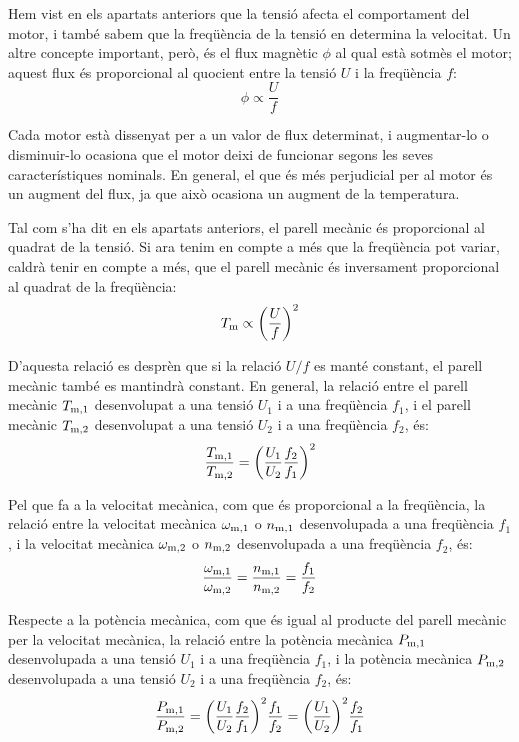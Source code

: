 Hem vist en els apartats anteriors que la tensió afecta el comportament del motor, i també sabem que la freqüència de la tensió en determina la velocitat. Un altre concepte important, però, és el flux magnètic $\phi$ al qual està sotmès el motor; aquest flux és proporcional al quocient entre la tensió $U$ i la freqüència $f$:
\begin{equation}
	\phi \propto \frac{U}{f}
\end{equation}

Cada motor està dissenyat per a un valor de flux determinat, i augmentar-lo  o disminuir-lo ocasiona que el motor deixi de funcionar segons les seves característiques nominals. En general, el que és més perjudicial per al motor és un augment del flux, ja que això ocasiona un  augment de la temperatura.

Tal com s'ha dit en els apartats anteriors, el parell mecànic és proporcional al quadrat de la tensió. Si ara tenim en compte a més que la freqüència pot variar, caldrà tenir en compte a més, que el parell mecànic és inversament proporcional al quadrat de la freqüència:
\begin{equation}
	T_\mathrm{m} \propto {\left(\frac{U}{f}\right)}^2
\end{equation}

D'aquesta relació es desprèn que si la relació $U/f$ es manté constant, el parell mecànic també es mantindrà constant. En general, la relació entre el parell mecànic $T_\mathrm{m,1}$ desenvolupat a una tensió $U_1$ i a una freqüència $f_1$, i el parell mecànic $T_\mathrm{m,2}$ desenvolupat a una tensió $U_2$ i a una freqüència $f_2$, és:
\begin{equation}\label{eq:Tm_U_f}
	\frac{T_\mathrm{m,1}}{T_\mathrm{m,2}}={\left(\frac{{U}_{1}}{{U}_{2}}\frac{{f}_{2}}{{f}_{1}}\right)}^2
\end{equation}

Pel que fa a la velocitat mecànica, com que és proporcional a la freqüència, la relació entre la velocitat mecànica $\omega_\mathrm{m,1}$ o $n_\mathrm{m,1}$ desenvolupada a una freqüència $f_1$, i la velocitat mecànica $\omega_\mathrm{m,2}$ o $n_\mathrm{m,2}$ desenvolupada a una freqüència $f_2$, és:
\begin{equation}\label{eq:nm_U_f}
	\frac{\omega_\mathrm{m,1}}{\omega_\mathrm{m,2}} = \frac{n_\mathrm{m,1}}{n_\mathrm{m,2}} = \frac{f_1}{f_2}
\end{equation}

Respecte a la  potència mecànica, com que  és igual al producte del parell mecànic per la velocitat mecànica, la relació entre la potència mecànica $P_\mathrm{m,1}$ desenvolupada a una tensió $U_1$ i a una freqüència $f_1$, i la potència mecànica $P_\mathrm{m,2}$ desenvolupada a una tensió $U_2$ i a una freqüència $f_2$, és:
\begin{equation}\label{eq:Pm_U_f}
	\frac{P_\mathrm{m,1}}{P_\mathrm{m,2}} =
	{\left(\frac{{U}_{1}}{{U}_{2}}\frac{{f}_{2}}{{f}_{1}}\right)}^2
	\frac{f_1}{f_2} = 	
	 {\left(\frac{{U}_{1}}{{U}_{2}}\right)}^{2} \frac{{f}_{2}}{{f}_{1}}
\end{equation}


